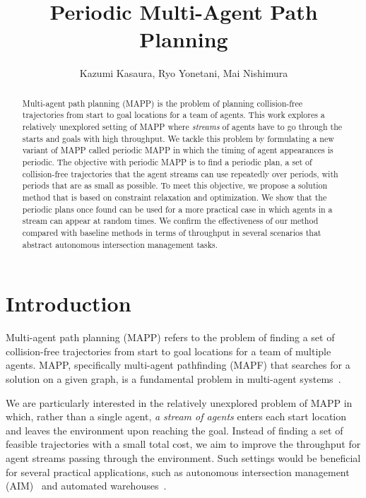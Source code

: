 \documentclass[letterpaper]{article} %
\title{Periodic Multi-Agent Path Planning}
\author {
    Kazumi Kasaura,
    Ryo Yonetani,
    Mai Nishimura
}
\begin{document}
\maketitle

\begin{abstract}
Multi-agent path planning (MAPP) is the problem of planning collision-free trajectories from start to goal locations for a team of agents. This work explores a relatively unexplored setting of MAPP where \emph{streams} of agents have to go through the starts and goals with high throughput. We tackle this problem by formulating a new variant of MAPP called periodic MAPP in which the timing of agent appearances is periodic. The objective with periodic MAPP is to find a periodic plan, a set of collision-free trajectories that the agent streams can use repeatedly over periods, with periods that are as small as possible. To meet this objective, we propose a solution method that is based on constraint relaxation and optimization. We show that the periodic plans once found can be used for a more practical case in which agents in a stream can appear at random times. We confirm the effectiveness of our method compared with baseline methods in terms of throughput in several scenarios that abstract autonomous intersection management tasks.
\end{abstract}

\section{Introduction}

Multi-agent path planning (MAPP) refers to the problem of finding a set of collision-free trajectories from start to goal locations for a team of multiple agents. MAPP, specifically multi-agent pathfinding (MAPF) that searches for a solution on a given graph, is a fundamental problem in multi-agent systems~\cite{stern2019multi}.

We are particularly interested in the relatively unexplored problem of MAPP in which, rather than a single agent, \emph{a stream of agents} enters each start location and leaves the environment upon reaching the goal. Instead of finding a set of feasible trajectories with a small total cost, we aim to improve the throughput for agent streams passing through the environment. Such settings would be beneficial for several practical applications, such as autonomous intersection management (AIM)~\cite{dresner2008multiagent} and automated warehouses~\cite{wurman2008coordinating}.
\end{document}

